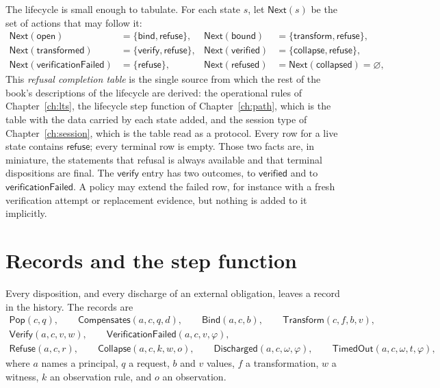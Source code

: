 \documentclass[11pt,openany]{book}
\theoremstyle{remark}
\newcommand{\Pop}{\mathsf{Pop}}
\newcommand{\Refuse}{\mathsf{Refuse}}
\newcommand{\Bind}{\mathsf{Bind}}
\newcommand{\Transform}{\mathsf{Transform}}
\newcommand{\Verify}{\mathsf{Verify}}
\newcommand{\Collapse}{\mathsf{Collapse}}
\newcommand{\Compensates}{\mathsf{Compensates}}
\begin{document}
The lifecycle is small enough to tabulate. For each state $s$, let
$\mathsf{Next}(s)$ be the set of actions that may follow it:
\[
\begin{aligned}
\mathsf{Next}(\mathsf{open})&=\{\mathsf{bind},\mathsf{refuse}\},&
\mathsf{Next}(\mathsf{bound})&=\{\mathsf{transform},\mathsf{refuse}\},\\
\mathsf{Next}(\mathsf{transformed})&=\{\mathsf{verify},\mathsf{refuse}\},&
\mathsf{Next}(\mathsf{verified})&=\{\mathsf{collapse},\mathsf{refuse}\},\\
\mathsf{Next}(\mathsf{verificationFailed})&=\{\mathsf{refuse}\},&
\mathsf{Next}(\mathsf{refused})&=\mathsf{Next}(\mathsf{collapsed})=\varnothing,
\end{aligned}
\]
This \emph{refusal completion table} is the single source from which the
rest of the book's descriptions of the lifecycle are derived: the
operational rules of Chapter~\ref{ch:lts}, the lifecycle step function of
Chapter~\ref{ch:path}, which is the table with the data carried by each
state added, and the session type of Chapter~\ref{ch:session}, which is the table read
as a protocol. Every row for a live state contains $\mathsf{refuse}$; every
terminal row is empty. Those two facts are, in miniature, the statements
that refusal is always available and that terminal dispositions are
final. The $\mathsf{verify}$ entry has two outcomes, to $\mathsf{verified}$
and to $\mathsf{verificationFailed}$. A policy may extend the failed row,
for instance with a fresh verification attempt or replacement evidence,
but nothing is added to it implicitly.

\section{Records and the step function}
\label{sec:records}

Every disposition, and every discharge of an external obligation, leaves
a record in the history. The records are
\[
\begin{gathered}
\Pop(c,q),\qquad \Compensates(a,c,q,d),\qquad \Bind(a,c,b),\qquad
\Transform(c,f,b,v),\\
\Verify(a,c,v,w),\qquad \mathsf{VerificationFailed}(a,c,v,\varphi),\\
\Refuse(a,c,r),\qquad
\Collapse(a,c,k,w,o),\qquad
\mathsf{Discharged}(a,c,\omega,\varphi),\qquad
\mathsf{TimedOut}(a,c,\omega,t,\varphi),
\end{gathered}
\]
where $a$ names a principal, $q$ a request, $b$ and $v$ values, $f$ a
transformation, $w$ a witness, $k$ an observation rule, and $o$ an
observation.
\end{document}
